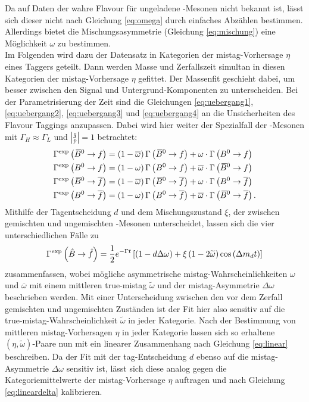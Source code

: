 Da auf Daten der wahre Flavour für ungeladene \B-Mesonen nicht bekannt ist, lässt sich dieser nicht nach Gleichung \eqref{eq:omega} durch einfaches Abzählen bestimmen. Allerdings bietet die Mischungsasymmetrie (Gleichung \eqref{eq:mischung}) eine Möglichkeit $\omega$ zu bestimmen.\\ 
Im Folgenden wird dazu der Datensatz in Kategorien der mistag-Vorhersage $\eta$ eines Taggers geteilt. Dann werden Masse und Zerfallszeit simultan in diesen Kategorien der mistag-Vorhersage $\eta$ gefittet. Der Massenfit geschieht dabei, um besser zwischen den Signal und Untergrund-Komponenten zu unterscheiden. Bei der Parametrisierung der Zeit sind die Gleichungen \eqref{eq:uebergang1}, \eqref{eq:uebergang2}, \eqref{eq:uebergang3} und \eqref{eq:uebergang4} an die Unsicherheiten des Flavour Taggings anzupassen. Dabei wird hier weiter der Spezialfall der \Bz-Mesonen mit $\Gamma_H\approx\Gamma_L$ und $\left|\tfrac{q}{p}\right|=1$ betrachtet:
\begin{equation}
\begin{split}
\Gamma^\text{exp}\left({{\kern 0.18em\overline{\kern -0.18em B}{}}{}^0}\rightarrow f\right)&=\left(1-\overline{\omega}\right)\Gamma\left({{\kern 0.18em\overline{\kern -0.18em B}{}}{}^0}\rightarrow f\right)+\omega\cdot\Gamma\left({{B}^0}\rightarrow f\right)\\
\Gamma^\text{exp}\left({{B}^0}\rightarrow f\right)&=\left(1-\omega\right)\Gamma\left({{B}^0}\rightarrow f\right)+\overline{\omega}\cdot\Gamma\left({{\kern 0.18em\overline{\kern -0.18em B}{}}{}^0}\rightarrow f\right)\\
\Gamma^\text{exp}\left({{\kern 0.18em\overline{\kern -0.18em B}{}}{}^0}\rightarrow\overline{f}\right)&=\left(1-\overline{\omega}\right)\Gamma\left({{\kern 0.18em\overline{\kern -0.18em B}{}}{}^0}\rightarrow\overline{f}\right)+\omega\cdot\Gamma\left({{B}^0}\rightarrow\overline{f}\right)\\
\Gamma^\text{exp}\left({{B}^0}\rightarrow\overline{f}\right)&=\left(1-\omega\right)\Gamma\left({{B}^0}\rightarrow\overline{f}\right)+\overline{\omega}\cdot\Gamma\left({{\kern 0.18em\overline{\kern -0.18em B}{}}{}^0}\rightarrow\overline{f}\right).
\end{split}
\end{equation}
Mithilfe der Tagentscheidung $d$ und dem Mischungszustand $\xi$, der zwischen gemischten und ungemischten \B-Mesonen unterscheidet, lassen sich die vier unterschiedlichen Fälle zu
\begin{equation}
\Gamma^\text{exp}\left(\hat{B}\rightarrow\hat{f}\right)=\frac{1}{2}e^{-\Gamma t}\left[\left(1-d\Delta\omega\right)+\xi\left(1-2\widetilde{\omega}\right)\cos\left({\Delta m_{{d}}} t\right)\right]
\end{equation}
zusammenfassen, wobei mögliche asymmetrische mistag-Wahrscheinlichkeiten $\omega$ und $\overline{\omega}$ mit einem mittleren true-mistag $\widetilde{\omega}$ und der mistag-Asymmetrie $\Delta\omega$ beschrieben werden. Mit einer Unterscheidung zwischen den vor dem Zerfall gemischten und ungemischten Zuständen ist der Fit hier also sensitiv auf die true-mistag-Wahrscheinlichkeit $\widetilde{\omega}$ in jeder Kategorie. Nach der Bestimmung von mittleren mistag-Vorhersagen $\eta$ in jeder Kategorie lassen sich so erhaltene $(\eta,\widetilde{\omega})$-Paare nun mit ein linearer Zusammenhang nach Gleichung \eqref{eq:linear} beschreiben. Da der Fit mit der tag-Entscheidung $d$ ebenso auf die mistag-Asymmetrie $\Delta \omega$ sensitiv ist, lässt sich diese analog gegen die Kategoriemittelwerte der mistag-Vorhersage $\eta$ auftragen und nach Gleichung \eqref{eq:lineardelta} kalibrieren.\\

